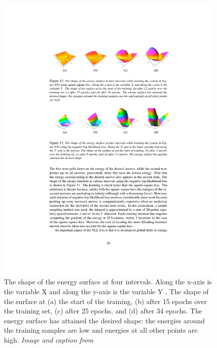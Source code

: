 \begin{figure}[!ht]
\centering
\includegraphics[scale=1.15]{figures/ebm-intervals}
\caption[Energy surface evolution]{The shape of the energy surface at four intervals. Along the x-axis is the variable X and along the y-axis is the variable Y . The shape of the surface at (a) the start of the training, (b) after 15 epochs over the training set, (c) after 25 epochs, and (d) after 34 epochs. The energy surface has attained the desired shape: the energies around the training samples are low and energies at all other points are high. \textit{Image and caption from} \,\citep{ebm-tutorial}}
\label{fig:ebm-intervals}
\end{figure}





